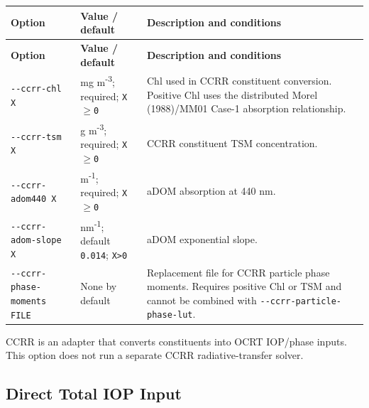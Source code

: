 {\TableFont
\begin{longtable}{@{}>{\raggedright\arraybackslash}p{}>{\raggedright\arraybackslash}p{}>{\raggedright\arraybackslash}p{}@{}}
\toprule
\textbf{Option} & \textbf{Value / default} & \textbf{Description and conditions} \\
\midrule
\endfirsthead
\toprule
\textbf{Option} & \textbf{Value / default} & \textbf{Description and conditions} \\
\midrule
\endhead
\bottomrule
\endfoot
\texttt{-\allowbreak{}-\allowbreak{}ccrr-\allowbreak{}chl X} & mg m\textsuperscript{-}\textsuperscript{3}; required; \texttt{X\ensuremath{\geq}0} & Chl used in CCRR constituent conversion. Positive Chl uses the distributed Morel (1988)/MM01 Case-1 absorption relationship. \\
\texttt{-\allowbreak{}-\allowbreak{}ccrr-\allowbreak{}tsm X} & g m\textsuperscript{-}\textsuperscript{3}; required; \texttt{X\ensuremath{\geq}0} & CCRR constituent TSM concentration. \\
\texttt{-\allowbreak{}-\allowbreak{}ccrr-\allowbreak{}adom440 X} & m\textsuperscript{-}\textsuperscript{1}; required; \texttt{X\ensuremath{\geq}0} & aDOM absorption at 440 nm. \\
\texttt{-\allowbreak{}-\allowbreak{}ccrr-\allowbreak{}adom-\allowbreak{}slope X} & nm\textsuperscript{-}\textsuperscript{1}; default \texttt{0.\allowbreak{}014}; \texttt{X>0} & aDOM exponential slope. \\
\texttt{-\allowbreak{}-\allowbreak{}ccrr-\allowbreak{}phase-\allowbreak{}moments FILE} & None by default & Replacement file for CCRR particle phase moments. Requires positive Chl or TSM and cannot be combined with \texttt{-\allowbreak{}-\allowbreak{}ccrr-\allowbreak{}particle-\allowbreak{}phase-\allowbreak{}lut}. \\
\end{longtable}
}

CCRR is an adapter that converts constituents into OCRT IOP/phase inputs. This option does not run a separate CCRR radiative-transfer solver.

\subsection{Direct Total IOP Input}
\label{sec:auto:03_options:5.3}

